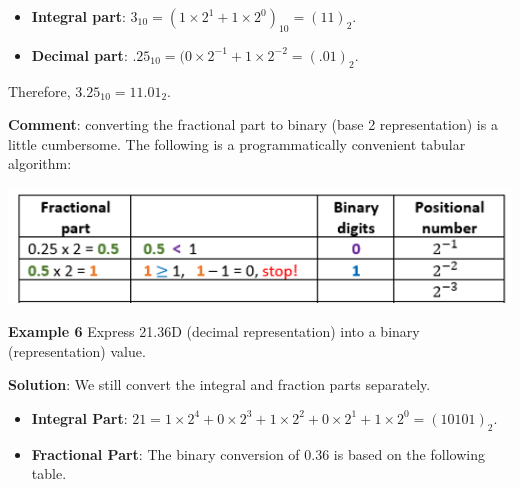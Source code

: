 \documentclass[
]{book}
\begin{document}
\begin{itemize}
\item
  \textbf{Integral part}: \(3_{10} = (1\times 2^1 + 1\times 2^0)_{10} = (11)_2\).
\item
  \textbf{Decimal part}: \(.25_{10} = (0\times 2^{-1} + 1\times 2^{-2} = (.01)_2\).
\end{itemize}

Therefore, \(3.25_{10} = 11.01_2\).

\hfill\break

\textbf{Comment}: converting the fractional part to binary (base 2 representation) is a little cumbersome. The following is a programmatically convenient tabular algorithm:

\begin{center}\includegraphics[width=0.75\linewidth]{img02/w02-TabularConversionBase2Fraction} \end{center}

\hfill\break

\textbf{Example 6} Express 21.36D (decimal representation) into a binary (representation) value.

\textbf{Solution}: We still convert the integral and fraction parts separately.

\begin{itemize}
\item
  \textbf{Integral Part}: \(21 = 1\times 2^4 + 0\times 2^3 + 1\times 2^2 + 0\times 2^1 + 1 \times 2^0 = (10101)_2\).
\item
  \textbf{Fractional Part}: The binary conversion of \(0.36\) is based on the following table.
\end{itemize}
\end{document}
